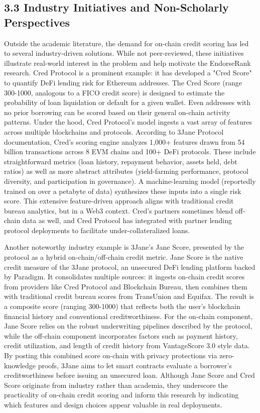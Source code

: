 \subsection*{3.3 Industry Initiatives and Non-Scholarly Perspectives}
\label{sec:industry-initiatives-and-non-scholarly-perspectives}

Outside the academic literature, the demand for on-chain credit scoring has led to several industry-driven solutions. While not peer-reviewed, these initiatives illustrate real-world interest in the problem and help motivate the EndorseRank research. Cred Protocol is a prominent example: it has developed a "Cred Score" to quantify DeFi lending risk for Ethereum addresses. The Cred Score (range 300-1000, analogous to a FICO credit score) is designed to estimate the probability of loan liquidation or default for a given wallet. Even addresses with no prior borrowing can be scored based on their general on-chain activity patterns. Under the hood, Cred Protocol's model ingests a vast array of features across multiple blockchains and protocols. According to 3Jane Protocol documentation, Cred's scoring engine analyzes 1,000+ features drawn from 54 billion transactions across 8 EVM chains and 100+ DeFi protocols. These include straightforward metrics (loan history, repayment behavior, assets held, debt ratios) as well as more abstract attributes (yield-farming performance, protocol diversity, and participation in governance). A machine-learning model (reportedly trained on over a petabyte of data) synthesizes these inputs into a single risk score. This extensive feature-driven approach aligns with traditional credit bureau analytics, but in a Web3 context. Cred's partners sometimes blend off-chain data as well, and Cred Protocol has integrated with partner lending protocol deployments to facilitate under-collateralized loans.


Another noteworthy industry example is 3Jane's Jane Score, presented by the protocol as a hybrid on-chain/off-chain credit metric. Jane Score is the native credit measure of the 3Jane protocol, an unsecured DeFi lending platform backed by Paradigm. It consolidates multiple sources: it ingests on-chain credit scores from providers like Cred Protocol and Blockchain Bureau, then combines them with traditional credit bureau scores from TransUnion and Equifax. The result is a composite score (ranging 300-1000) that reflects both the user's blockchain financial history and conventional creditworthiness. For the on-chain component, Jane Score relies on the robust underwriting pipelines described by the protocol, while the off-chain component incorporates factors such as payment history, credit utilization, and length of credit history from VantageScore 3.0 style data. By posting this combined score on-chain with privacy protections via zero-knowledge proofs, 3Jane aims to let smart contracts evaluate a borrower's creditworthiness before issuing an unsecured loan. Although Jane Score and Cred Score originate from industry rather than academia, they underscore the practicality of on-chain credit scoring and inform this research by indicating which features and design choices appear valuable in real deployments.


